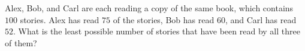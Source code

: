 Alex, Bob, and Carl are each reading a copy of the same book, which contains $100$ stories. Alex has read $75$ of the stories, Bob has read $60$, and Carl has read $52$. What is the least possible number of stories that have been read by all three of them?
